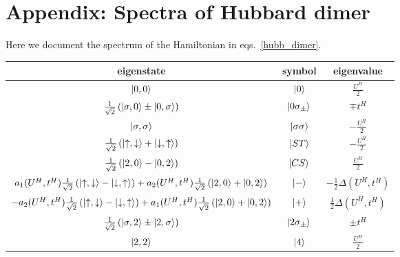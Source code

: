 \documentclass[12pt]{article}
\numberwithin{equation}{section}
\begin{document}
\newpage
\section*{Appendix: Spectra of Hubbard dimer}
Here we document the spectrum of the Hamiltonian in eqs.~\ref{hubb_dimer}.
\begin{center}
	\begin{tabular}{|c|c|c|}
	\hline
	eigenstate & symbol & eigenvalue \\
	\hline
	$\ket{0,0}$ & $\ket{0}$ & \( \frac{U^H}{2}\)\\
	$ \frac{1}{\sqrt 2}\left(\ket{\sigma,0} \pm \ket{0,\sigma}\right)$ & $\ket{0\sigma_\pm}$ & \(\mp t^H\)\\
	$\ket{\sigma,\sigma}$ & $\ket{\sigma\sigma}$ & \( -\frac{U^H}{2}\)\\
	$ \frac{1}{\sqrt 2}\left(\ket{\uparrow,\downarrow} + \ket{\downarrow,\uparrow}\right)$ & $\ket{ST}$ & \( -\frac{U^H}{2}\)\\
	$ \frac{1}{\sqrt 2}\left(\ket{2,0} - \ket{0,2}\right)$ & $\ket{CS}$ & \( \frac{U^H}{2}\)\\
	$a_1(U^H, t^H) \frac{1}{\sqrt 2}\left(\ket{\uparrow,\downarrow} - \ket{\downarrow,\uparrow}\right) + a_2(U^H, t^H)\frac{1}{\sqrt 2}\left(\ket{2,0} + \ket{0,2}\right)$ & $\ket{-}$ & \(-\frac{1}{2}\Delta(U^H, t^H)\)\\
	$-a_2(U^H, t^H) \frac{1}{\sqrt 2}\left(\ket{\uparrow,\downarrow} - \ket{\downarrow,\uparrow}\right) + a_1(U^H, t^H)\frac{1}{\sqrt 2}\left(\ket{2,0} + \ket{0,2}\right)$ & $\ket{+}$ & \(\frac{1}{2}\Delta(U^H, t^H)\)\\
	$ \frac{1}{\sqrt 2}\left(\ket{\sigma,2} \pm \ket{2,\sigma}\right)$ & $\ket{2\sigma_\pm}$ & \(\pm t^H\)\\
	$\ket{2,2}$ & $\ket{4}$ & \( \frac{U^H}{2}\)\\
\hline
	\end{tabular}
	\label{hubb_dim_spectrum}

\end{center}
\end{document}
